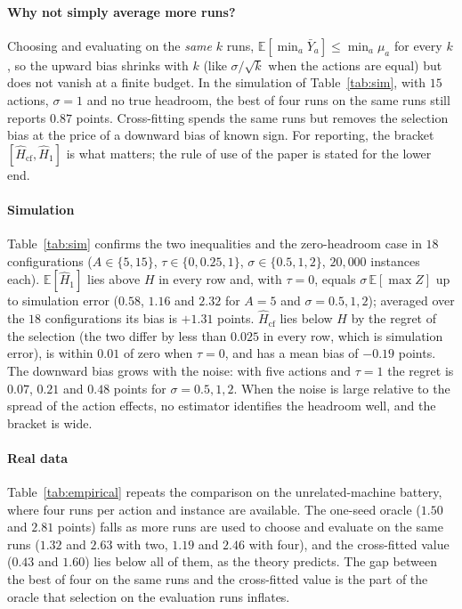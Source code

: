 \paragraph{Why not simply average more runs?} Choosing and evaluating on the \emph{same} $k$ runs, $\mathbb E[\min_a\bar Y_a]\le\min_a\mu_a$ for every $k$, so the upward bias shrinks with $k$ (like $\sigma/\sqrt k$ when the actions are equal) but does not vanish at a finite budget. In the simulation of Table~\ref{tab:sim}, with $15$ actions, $\sigma=1$ and no true headroom, the best of four runs on the same runs still reports $0.87$ points. Cross-fitting spends the same runs but removes the selection bias at the price of a downward bias of known sign. For reporting, the bracket $[\hat H_{\mathrm{cf}},\hat H_1]$ is what matters; the rule of use of the paper is stated for the lower end.

\paragraph{Simulation} Table~\ref{tab:sim} confirms the two inequalities and the zero-headroom case in $18$ configurations ($A\in\{5,15\}$, $\tau\in\{0,0.25,1\}$, $\sigma\in\{0.5,1,2\}$, $20{,}000$ instances each). $\mathbb E[\hat H_1]$ lies above $H$ in every row and, with $\tau=0$, equals $\sigma\,\mathbb E[\max Z]$ up to simulation error ($0.58$, $1.16$ and $2.32$ for $A=5$ and $\sigma=0.5,1,2$); averaged over the $18$ configurations its bias is $+1.31$ points. $\hat H_{\mathrm{cf}}$ lies below $H$ by the regret of the selection (the two differ by less than $0.025$ in every row, which is simulation error), is within $0.01$ of zero when $\tau=0$, and has a mean bias of $-0.19$ points. The downward bias grows with the noise: with five actions and $\tau=1$ the regret is $0.07$, $0.21$ and $0.48$ points for $\sigma=0.5,1,2$. When the noise is large relative to the spread of the action effects, no estimator identifies the headroom well, and the bracket is wide.



\paragraph{Real data} Table~\ref{tab:empirical} repeats the comparison on the unrelated-machine battery, where four runs per action and instance are available. The one-seed oracle ($1.50$ and $2.81$ points) falls as more runs are used to choose and evaluate on the same runs ($1.32$ and $2.63$ with two, $1.19$ and $2.46$ with four), and the cross-fitted value ($0.43$ and $1.60$) lies below all of them, as the theory predicts. The gap between the best of four on the same runs and the cross-fitted value is the part of the oracle that selection on the evaluation runs inflates.


